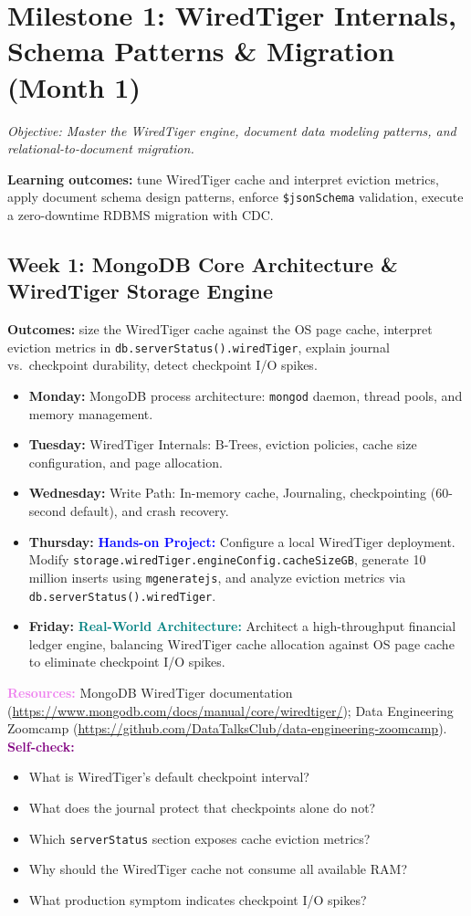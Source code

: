 \documentclass[11pt, a4paper]{article}
\newcommand{\project}[1]{\textbf{\textcolor{blue}{Hands-on Project:}} #1}
\newcommand{\usecase}[1]{\textbf{\textcolor{teal}{Real-World Architecture:}} #1}
\newcommand{\dayitem}[2]{\item \textbf{#1:} #2}
\newcommand{\selfcheck}[1]{\vspace{1mm}\noindent\textbf{\textcolor{purple}{Self-check:}} #1}
\newcommand{\resources}[1]{\vspace{1mm}\noindent\textbf{\textcolor{violet}{Resources:}} #1}
\begin{document}
\section{Milestone 1: WiredTiger Internals, Schema Patterns \& Migration (Month 1)}
\textit{Objective: Master the WiredTiger engine, document data modeling patterns, and relational-to-document migration.}
\par\noindent\textbf{Learning outcomes:} tune WiredTiger cache and interpret eviction metrics, apply document schema design patterns, enforce \texttt{\$jsonSchema} validation, execute a zero-downtime RDBMS migration with CDC.

\subsection*{Week 1: MongoDB Core Architecture \& WiredTiger Storage Engine}
\par\noindent\textbf{Outcomes:} size the WiredTiger cache against the OS page cache, interpret eviction metrics in \texttt{db.serverStatus().wiredTiger}, explain journal vs.\ checkpoint durability, detect checkpoint I/O spikes.
\begin{itemize}[label=-]
    \dayitem{Monday}{MongoDB process architecture: \texttt{mongod} daemon, thread pools, and memory management.}
    \dayitem{Tuesday}{WiredTiger Internals: B-Trees, eviction policies, cache size configuration, and page allocation.}
    \dayitem{Wednesday}{Write Path: In-memory cache, Journaling, checkpointing (60-second default), and crash recovery.}
    \dayitem{Thursday}{\project{Configure a local WiredTiger deployment. Modify \texttt{storage.wiredTiger.engineConfig.cacheSizeGB}, generate 10 million inserts using \texttt{mgeneratejs}, and analyze eviction metrics via \texttt{db.serverStatus().wiredTiger}.}}
    \dayitem{Friday}{\usecase{Architect a high-throughput financial ledger engine, balancing WiredTiger cache allocation against OS page cache to eliminate checkpoint I/O spikes.}}
\end{itemize}
\resources{MongoDB WiredTiger documentation (\url{https://www.mongodb.com/docs/manual/core/wiredtiger/}); Data Engineering Zoomcamp (\url{https://github.com/DataTalksClub/data-engineering-zoomcamp}).}
\selfcheck{\begin{itemize}[label=-, itemsep=0pt, leftmargin=1.5em]
    \item What is WiredTiger's default checkpoint interval?
    \item What does the journal protect that checkpoints alone do not?
    \item Which \texttt{serverStatus} section exposes cache eviction metrics?
    \item Why should the WiredTiger cache not consume all available RAM?
    \item What production symptom indicates checkpoint I/O spikes?
\end{itemize}}
\end{document}
